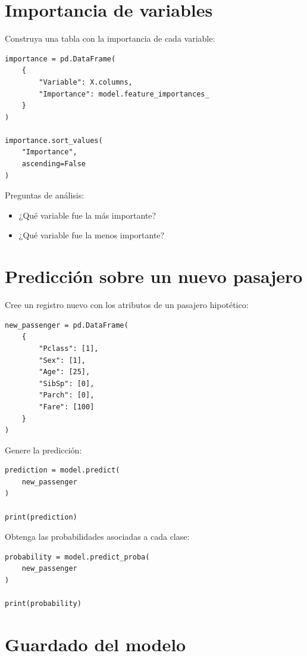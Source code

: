 \documentclass[
  coursetitle={Cómputo Nube y Tecnologías Emergentes},
  coursehours={96},
  coursedate={Verano 2026},
  doctype={Tutorial},
  otherlangs={english,french},
  authorname={Lázaro},
  authorsurname={Bustio-Martínez},
  authortitle={PhD},
  role={Profesor Investigador},
  email={lbustio@inaoe.mx},
  phone={5559504000},
  ext={7459},
  institution={Instituto Nacional de Astrofísica, Óptica y Electrónica (INAOE)},
  department={Maestría en Ciencias en Tecnologías de Seguridad},
  address={Luis Enrique Erro 1, Sta. Ma. Tonantzintla, San Andrés Cholula, CP 72840, Puebla, México},
  margin={0.5in}
]{../../lbustio_lecture_notes}
\begin{document}
\section{Importancia de variables}

Construya una tabla con la importancia de cada variable:

\begin{lstlisting}
importance = pd.DataFrame(
    {
        "Variable": X.columns,
        "Importance": model.feature_importances_
    }
)

importance.sort_values(
    "Importance",
    ascending=False
)
\end{lstlisting}

Preguntas de análisis:

\begin{itemize}
    \item ¿Qué variable fue la más importante?
    \item ¿Qué variable fue la menos importante?
\end{itemize}

\section{Predicción sobre un nuevo pasajero}

Cree un registro nuevo con los atributos de un pasajero hipotético:

\begin{lstlisting}
new_passenger = pd.DataFrame(
    {
        "Pclass": [1],
        "Sex": [1],
        "Age": [25],
        "SibSp": [0],
        "Parch": [0],
        "Fare": [100]
    }
)
\end{lstlisting}

Genere la predicción:

\begin{lstlisting}
prediction = model.predict(
    new_passenger
)

print(prediction)
\end{lstlisting}

Obtenga las probabilidades asociadas a cada clase:

\begin{lstlisting}
probability = model.predict_proba(
    new_passenger
)

print(probability)
\end{lstlisting}

\section{Guardado del modelo}
\end{document}
